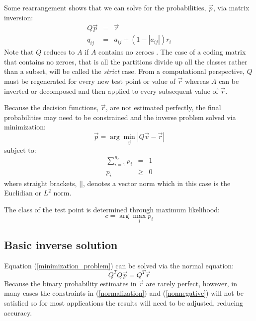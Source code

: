 \documentclass{article}
\begin{document}
Some rearrangement shows that
we can solve for the probabilities, $\vec p$, via matrix inversion:
\begin{eqnarray}
	Q \vec p & = & \vec r \label{basic_system}\\
	q_{ij} & = & a_{ij} + (1-|a_{ij}|) r_i 
	\label{matrix_equation2}
\end{eqnarray}
Note that $Q$ reduces to $A$ if $A$ contains no zeroes \citep{Kong_Dietterich1997}.
The case of a coding matrix that contains no zeroes, that is all the partitions divide up all the
classes rather than a subset, will be called the {\it strict} case.
From a computational perspective, 
$Q$ must be regenerated for every new test point or value of $\vec r$ 
whereas $A$ can be inverted or decomposed and then
applied to every subsequent value of $\vec r$.

Because the decision functions, $\vec r$, are not estimated perfectly,
the final probabilities may need to be constrained and the inverse
problem solved via minimization:
\begin{equation}
	\vec p = \arg \min_{\vec v} | Q \vec v - \vec r | \label{minimization_problem}
\end{equation}
subject to:
\begin{eqnarray}
	\sum_{i=1}^{n_c} p_i & = & 1 \label{normalization}\\
	p_i & \ge & 0 \label{nonnegative}
\end{eqnarray}
where straight brackets, $||$, denotes a vector norm which  
in this case is the Euclidian or $L^2$ norm.

The class of the test point is determined through maximum likelihood:
\begin{equation}
	c = \arg \max_i p_i
\end{equation}

\subsection{Basic inverse solution}

Equation (\ref{minimization_problem}) can be solved via the normal
equation:
\begin{equation}
	Q^T Q \vec p = Q^T \vec r
	\label{normal_equation}
\end{equation}
Because the binary probability estimates in $\vec r$ are rarely perfect, however,
in many cases the constraints in (\ref{normalization}) and (\ref{nonnegative}) will not be satisfied 
so for most applications the results will need to be adjusted, reducing accuracy.
\end{document}
